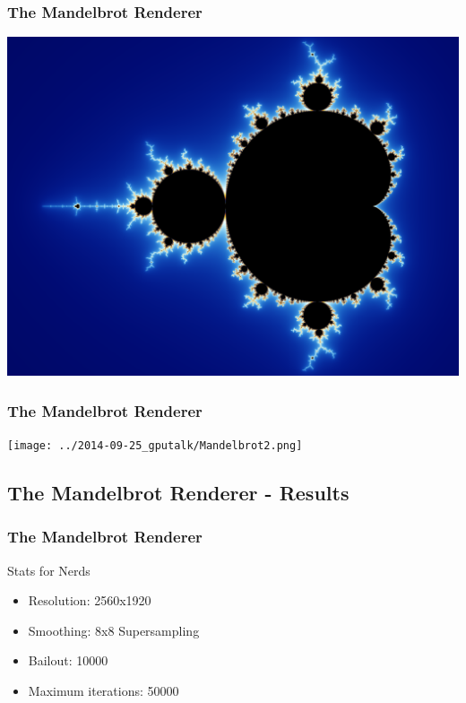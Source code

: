 \documentclass{beamer}
\begin{document}
\begin{frame}
    \frametitle{The Mandelbrot Renderer}
    \begin{center}
        \includegraphics[height=.8\textheight]{../2014-09-25_gputalk/Mandelbrot1.png}
    \end{center}
\end{frame}

\begin{frame}
    \frametitle{The Mandelbrot Renderer}
    \begin{center}
        \texttt{[image: ../2014-09-25\_gputalk/Mandelbrot2.png]}
    \end{center}
\end{frame}


\subsection{The Mandelbrot Renderer - Results}
\begin{frame}
    \frametitle{The Mandelbrot Renderer}
    \begin{block}{Stats for Nerds}
        \begin{itemize}
            \item Resolution: 2560x1920
            \item Smoothing: 8x8 Supersampling
            \item Bailout: 10000
            \item Maximum iterations: 50000
        \end{itemize}
    \end{block}
\end{frame}
\end{document}
